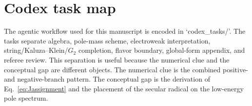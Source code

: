 \section{Codex task map}
\label{app:codex-map}

The agentic workflow used for this manuscript is encoded in `codex\_tasks/'.  The tasks separate algebra, pole-mass scheme, electroweak interpretation, string/Kaluza--Klein/\(G_2\) completion, flavor boundary, global-form appendix, and referee review.  This separation is useful because the numerical clue and the conceptual gap are different objects.  The numerical clue is the combined positive- and negative-branch pattern.  The conceptual gap is the derivation of Eq.~\eqref{eq:Jassignment} and the placement of the secular radical on the low-energy pole spectrum.

